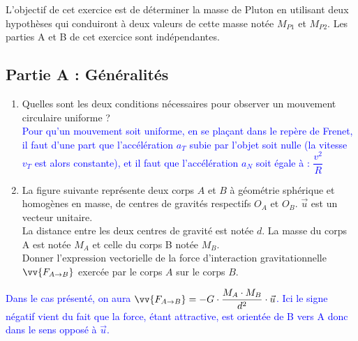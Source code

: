 \documentclass[a4paper,12pt]{article}
\begin{document}
L'objectif de cet exercice est de déterminer la masse de Pluton en utilisant deux hypothèses qui conduiront à deux valeurs de cette masse notée $M_{P1}$ et $M_{P2}$. Les parties A et B de cet exercice sont indépendantes.

\subsection*{Partie A : Généralités}
	\begin{enumerate}
	\item Quelles sont les deux conditions nécessaires pour observer un mouvement circulaire uniforme ?\\
	\textcolor{blue}{Pour qu'un mouvement soit uniforme, en se plaçant dans le repère de Frenet, il faut d'une part que l'accélération $a_T$ subie par l'objet soit nulle (la vitesse $v_T$ est alors constante), et il faut que l'accélération $a_N$ soit égale à : $\dfrac{v^2}{R}$}
	\item La figure suivante représente deux corps $A$ et $B$ à géométrie sphérique et homogènes en masse, de centres de gravités respectifs $O_A$ et $O_B$. $\vec{u}$ est un vecteur unitaire.\\
	La distance entre les deux centres de gravité est notée $d$.
	La masse du corps A est notée $M_A$ et celle du corps B notée $M_B$.\\
	Donner l'expression vectorielle de la force d'interaction gravitationnelle $\vv{F_{A\rightarrow B}}$ exercée par le corps $A$ sur le corps $B$.
	\end{enumerate}
\begin{center}
\end{center}
\textcolor{blue}{Dans le cas présenté, on aura $\vv{F_{A\rightarrow B}} = - G \cdot \dfrac{M_A \cdot M_B}{d^2} \cdot \vec{u}$. Ici le signe négatif vient du fait que la force, étant attractive, est orientée de B vers A donc dans le sens opposé à $\vec{u}$.}
\end{document}
